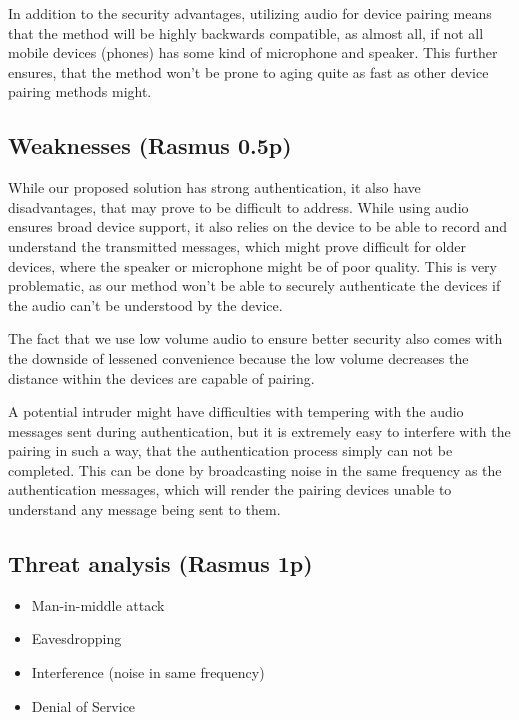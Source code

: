 \documentclass[12pt]{article}
\begin{document}
In addition to the security advantages, utilizing audio for device pairing means that the method will be highly backwards compatible, as almost all, if not all mobile devices (phones) has some kind of microphone and speaker. This further ensures, that the method won't be prone to aging quite as fast as other device pairing methods might.


\subsection{Weaknesses (Rasmus 0.5p)}
\label{sub:Weaknesses}

While our proposed solution has strong authentication, it also have disadvantages, that may prove to be difficult to address. While using audio ensures broad device support, it also relies on the device to be able to record and understand the transmitted messages, which might prove difficult for older devices, where the speaker or microphone might be of poor quality. This is very problematic, as our method won't be able to securely authenticate the devices if the audio can't be understood by the device.

The fact that we use low volume audio to ensure better security also comes with the downside of lessened convenience because the low volume decreases the distance within the devices are capable of pairing.

A potential intruder might have difficulties with tempering with the audio messages sent during authentication, but it is extremely easy to interfere with the pairing in such a way, that the authentication process simply can not be completed. This can be done by broadcasting noise in the same frequency as the authentication messages, which will render the pairing devices unable to understand any message being sent to them.


\subsection{Threat analysis (Rasmus 1p)}
\label{sub:Threat analysis}

\begin{itemize}
    \item Man-in-middle attack
    \item Eavesdropping
    \item Interference (noise in same frequency)
    \item Denial of Service
\end{itemize}
\end{document}
